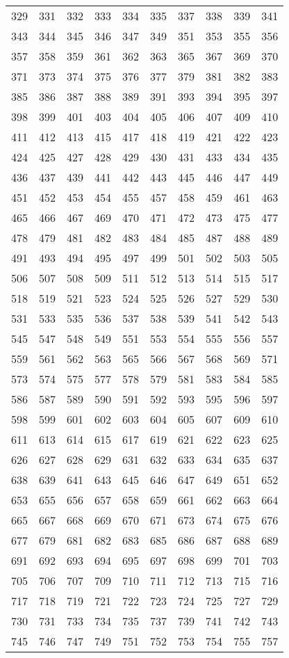 \begin{longtable}{*{10}{l}}
329&331&332&333&334&335&337&338&339&341\\
343&344&345&346&347&349&351&353&355&356\\
357&358&359&361&362&363&365&367&369&370\\
371&373&374&375&376&377&379&381&382&383\\
385&386&387&388&389&391&393&394&395&397\\
398&399&401&403&404&405&406&407&409&410\\
411&412&413&415&417&418&419&421&422&423\\
424&425&427&428&429&430&431&433&434&435\\
436&437&439&441&442&443&445&446&447&449\\
451&452&453&454&455&457&458&459&461&463\\
465&466&467&469&470&471&472&473&475&477\\
478&479&481&482&483&484&485&487&488&489\\
491&493&494&495&497&499&501&502&503&505\\
506&507&508&509&511&512&513&514&515&517\\
518&519&521&523&524&525&526&527&529&530\\
531&533&535&536&537&538&539&541&542&543\\
545&547&548&549&551&553&554&555&556&557\\
559&561&562&563&565&566&567&568&569&571\\
573&574&575&577&578&579&581&583&584&585\\
586&587&589&590&591&592&593&595&596&597\\
598&599&601&602&603&604&605&607&609&610\\
611&613&614&615&617&619&621&622&623&625\\
626&627&628&629&631&632&633&634&635&637\\
638&639&641&643&645&646&647&649&651&652\\
653&655&656&657&658&659&661&662&663&664\\
665&667&668&669&670&671&673&674&675&676\\
677&679&681&682&683&685&686&687&688&689\\
691&692&693&694&695&697&698&699&701&703\\
705&706&707&709&710&711&712&713&715&716\\
717&718&719&721&722&723&724&725&727&729\\
730&731&733&734&735&737&739&741&742&743\\
745&746&747&749&751&752&753&754&755&757\\

\end{longtable}

